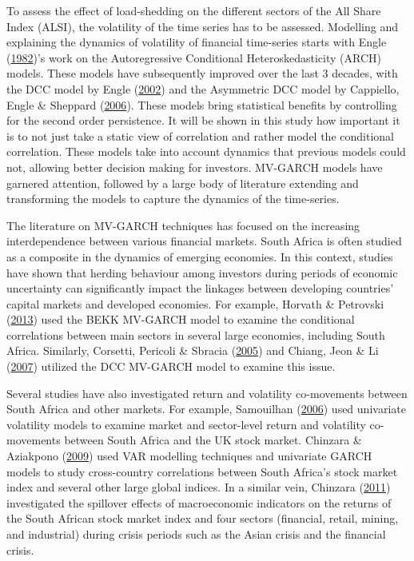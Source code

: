 \documentclass[11pt,preprint, authoryear]{elsarticle}
\numberwithin{equation}{section}
\numberwithin{figure}{section}
\numberwithin{table}{section}
\begin{document}
To assess the effect of load-shedding on the different sectors of the
All Share Index (ALSI), the volatility of the time series has to be
assessed. Modelling and explaining the dynamics of volatility of
financial time-series starts with Engle
(\protect\hyperlink{ref-engle}{1982})'s work on the Autoregressive
Conditional Heteroskedasticity (ARCH) models. These models have
subsequently improved over the last 3 decades, with the DCC model by
Engle (\protect\hyperlink{ref-engle2002}{2002}) and the Asymmetric DCC
model by Cappiello, Engle \& Sheppard
(\protect\hyperlink{ref-cappiello2006asymmetric}{2006}). These models
bring statistical benefits by controlling for the second order
persistence. It will be shown in this study how important it is to not
just take a static view of correlation and rather model the conditional
correlation. These models take into account dynamics that previous
models could not, allowing better decision making for investors.
MV-GARCH models have garnered attention, followed by a large body of
literature extending and transforming the models to capture the dynamics
of the time-series.

The literature on MV-GARCH techniques has focused on the increasing
interdependence between various financial markets. South Africa is often
studied as a composite in the dynamics of emerging economies. In this
context, studies have shown that herding behaviour among investors
during periods of economic uncertainty can significantly impact the
linkages between developing countries' capital markets and developed
economies. For example, Horvath \& Petrovski
(\protect\hyperlink{ref-horvath2013international}{2013}) used the BEKK
MV-GARCH model to examine the conditional correlations between main
sectors in several large economies, including South Africa. Similarly,
Corsetti, Pericoli \& Sbracia
(\protect\hyperlink{ref-corsetti2005some}{2005}) and Chiang, Jeon \& Li
(\protect\hyperlink{ref-chiang2007dynamic}{2007}) utilized the DCC
MV-GARCH model to examine this issue.

Several studies have also investigated return and volatility
co-movements between South Africa and other markets. For example,
Samouilhan (\protect\hyperlink{ref-samouilhan2006}{2006}) used
univariate volatility models to examine market and sector-level return
and volatility co-movements between South Africa and the UK stock
market. Chinzara \& Aziakpono
(\protect\hyperlink{ref-chinzara2009dynamic}{2009}) used VAR modelling
techniques and univariate GARCH models to study cross-country
correlations between South Africa's stock market index and several other
large global indices. In a similar vein, Chinzara
(\protect\hyperlink{ref-chinzara2011macroeconomic}{2011}) investigated
the spillover effects of macroeconomic indicators on the returns of the
South African stock market index and four sectors (financial, retail,
mining, and industrial) during crisis periods such as the Asian crisis
and the financial crisis.
\end{document}
